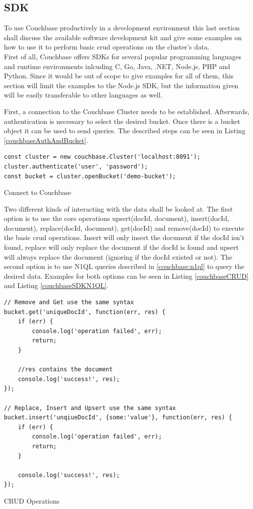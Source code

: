 \subsection{SDK}
\label{couchbase:section:SDK}
To use Couchbase productively in a development environment this last section shall discuss the available software development kit and give some examples on how to use it to perform basic \gls{crud} operations on the cluster's data.\\
First of all, Couchbase offers SDKs for several popular programming languages and runtime environments inlcuding C, Go, Java, .NET, Node.js, PHP and Python. \parencite{couchbaseSDK} Since it would be out of scope to give examples for all of them, this section will limit the examples to the Node.js SDK, but the information given will be easily transferable to other languages as well.

First, a connection to the Couchbase Cluster needs to be established. Afterwards, authentication is necessary to select the desired bucket. Once there is a bucket object it can be used to send queries. The described steps can be seen in Listing \ref{couchbaseAuthAndBucket}.\\
\begin{listing}[ht]
\begin{verbatim}
const cluster = new couchbase.Cluster('localhost:8091');
cluster.authenticate('user', 'password');
const bucket = cluster.openBucket('demo-bucket');
\end{verbatim}
\caption{Connect to Couchbase}
\label{couchbaseAuthAndBucket}
\end{listing}

\newpage
Two different kinds of interacting with the data shall be looked at. The first option is to use the core operations upsert(docId, document), insert(docId, document), replace(docId, document), get(docId) and remove(docId) to execute the basic \gls{crud} operations. Insert will only insert the document if the docId isn't found, replace will only replace the document if the docId is found and upsert will always replace the document (ignoring if the docId existed or not). The second option is to use N1QL queries described in \autoref{couchbase:n1ql} to query the desired data. Examples for both options can be seen in Listing \ref{couchbaseCRUD} and Listing \ref{couchbaseSDKN1QL}.\\

\begin{listing}[ht]
\begin{verbatim}
// Remove and Get use the same syntax
bucket.get('uniqueDocId', function(err, res) {
    if (err) {
        console.log('operation failed', err);
        return;
    }
    
    //res contains the document
    console.log('success!', res);
});

// Replace, Insert and Upsert use the same syntax
bucket.insert('unqiueDocId', {some:'value'}, function(err, res) {
    if (err) {
        console.log('operation failed', err);
        return;
    }

    console.log('success!', res);
});
\end{verbatim}
\caption{CRUD Operations}
\label{couchbaseCRUD}
\end{listing}

